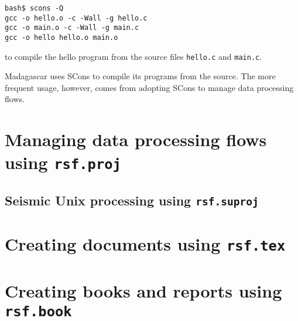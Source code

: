 \begin{verbatim}
bash$ scons -Q
gcc -o hello.o -c -Wall -g hello.c
gcc -o main.o -c -Wall -g main.c
gcc -o hello hello.o main.o
\end{verbatim}
to compile the hello program from the source files \texttt{hello.c} and \texttt{main.c}.

Madagascar uses SCons to compile its programs from the source. The more frequent usage, however, comes from adopting SCons to manage data processing flows.

\section{Managing data processing flows using \texttt{rsf.proj}}

\subsection{Seismic Unix processing using  \texttt{rsf.suproj}}

\section{Creating documents using \texttt{rsf.tex}}

\section{Creating books and reports using \texttt{rsf.book}}



